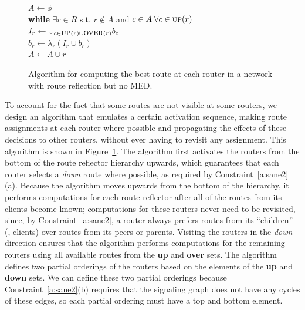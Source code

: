 \begin{figure}[t]
\begin{small}
\begin{center}
{\begin{minipage}{4in}
\begin{tabbing}
\> $A \leftarrow \phi$\\
\> {\bf while} $\exists r \in R$ s.t. $r \not\in A$ and $c
\in A \; \forall c \in \mbox{{\sc up}}(r)$\\ 
\>\> $I_r \leftarrow \cup_{c \in\mbox{{\sc up}}(r) \cup \mbox{{\sc
      over}}(r)} b_c$ \\ 
\>\> $b_r \leftarrow \lambda_r(I_r \cup b_r)$ \\
\>\> $A \leftarrow A \cup r$ 
\end{tabbing}
\end{minipage}
}
\end{center}
\end{small}
\caption[Algorithm: Route Reflection, No MED]{Algorithm for computing the
  best route at each router in a 
  network with route reflection but no MED.}
\label{fig:best_ibgp}
\end{figure}

To account for the fact that some routes are not visible at some routers,
we design an algorithm that emulates a certain activation sequence,
making route assignments at each router where possible and 
propagating the effects of these decisions to other routers, without
ever having to revisit any assignment. This algorithm is
shown in Figure~\ref{fig:best_ibgp}.
%
The algorithm first activates the routers from the bottom of the
route reflector hierarchy upwards, which guarantees that
each router selects a {\em down\/} route where possible, as
required by Constraint~\ref{a:sane2}(a).   Because the algorithm moves
upwards from the bottom of the hierarchy, it performs computations for
each route reflector after all of the routes from its clients become known;
computations for these routers never need to be revisited, since, by
Constraint~\ref{a:sane2}, a router always prefers routes from its
``children'' (\ie, clients) over routes from its peers or parents.
%
Visiting the routers in the {\em down\/} direction ensures
that the algorithm performs computations for the remaining routers using
all available routes from the {\bf up} and {\bf over} sets.
%
The algorithm defines two partial orderings of the
routers based on the elements of the {\bf up} and {\bf down} sets.
We can define these two partial orderings because Constraint~\ref{a:sane2}(b)
requires that the signaling graph does not have any cycles of these
edges, so each partial ordering must have a top and bottom element.
%

